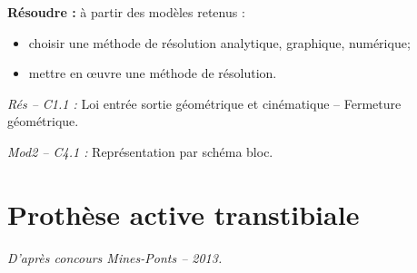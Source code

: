 \documentclass[10pt]{article}
\newif\ifprof
\begin{document}






\begin{comp}
\noindent \textbf{Résoudre :} à partir des modèles retenus :
\begin{itemize}
\item choisir une méthode de résolution analytique, graphique, numérique;
\item mettre en \oe{}uvre une méthode de résolution.
\end{itemize}

\noindent \textit{Rés -- C1.1 :} Loi entrée sortie géométrique et cinématique -- Fermeture géométrique.

\noindent \textit{Mod2 -- C4.1 :} Représentation par schéma bloc.
\end{comp}

\section*{Prothèse active transtibiale}

\begin{flushright}
\textit{D'après concours Mines-Ponts -- 2013.}
\end{flushright}

\ifprof
\else
\end{document}
